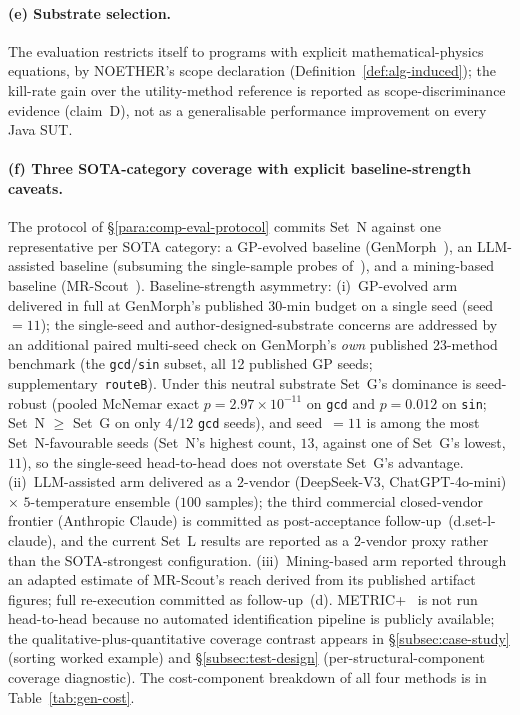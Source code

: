\documentclass[acmsmall,screen,review]{acmart}
\begin{document}
\paragraph{(e) Substrate selection.}
The evaluation restricts itself to programs with explicit mathematical-physics equations, by NOETHER's scope declaration (Definition~\ref{def:alg-induced}); the kill-rate gain over the utility-method reference is reported as scope-discriminance evidence (claim~D), not as a generalisable performance improvement on every Java SUT.

\paragraph{(f) Three SOTA-category coverage with explicit baseline-strength caveats.}
The protocol of \S\ref{para:comp-eval-protocol} commits Set~N against one representative per SOTA category: a GP-evolved baseline (GenMorph~\cite{GenMorph2024}), an LLM-assisted baseline (subsuming the single-sample probes of~\cite{Shin2024,ZhangChatGPTMR2023,GPTMR2025,AutoMT2025}), and a mining-based baseline (MR-Scout~\cite{MRScout2024}). Baseline-strength asymmetry: (i)~GP-evolved arm delivered in full at GenMorph's published 30-min budget on a single seed (seed~$=11$); the single-seed and author-designed-substrate concerns are addressed by an additional paired multi-seed check on GenMorph's \emph{own} published 23-method benchmark (the \texttt{gcd}/\texttt{sin} subset, all 12 published GP seeds; supplementary~\texttt{routeB}). Under this neutral substrate Set~G's dominance is seed-robust (pooled McNemar exact $p = 2.97\times10^{-11}$ on \texttt{gcd} and $p = 0.012$ on \texttt{sin}; Set~N $\geq$ Set~G on only $4/12$ \texttt{gcd} seeds), and seed~$=11$ is among the most Set~N-favourable seeds (Set~N's highest count, $13$, against one of Set~G's lowest, $11$), so the single-seed head-to-head does not overstate Set~G's advantage. (ii)~LLM-assisted arm delivered as a $2$-vendor (DeepSeek-V3, ChatGPT-4o-mini) $\times$ $5$-temperature ensemble ($100$ samples); the third commercial closed-vendor frontier (Anthropic Claude) is committed as post-acceptance follow-up~(d.set-l-claude), and the current Set~L results are reported as a $2$-vendor proxy rather than the SOTA-strongest configuration. (iii)~Mining-based arm reported through an adapted estimate of MR-Scout's reach derived from its published artifact figures; full re-execution committed as follow-up~(d). METRIC+~\cite{SunMETRICplus2021} is not run head-to-head because no automated identification pipeline is publicly available; the qualitative-plus-quantitative coverage contrast appears in \S\ref{subsec:case-study} (sorting worked example) and \S\ref{subsec:test-design} (per-structural-component coverage diagnostic). The cost-component breakdown of all four methods is in Table~\ref{tab:gen-cost}.
\end{document}
